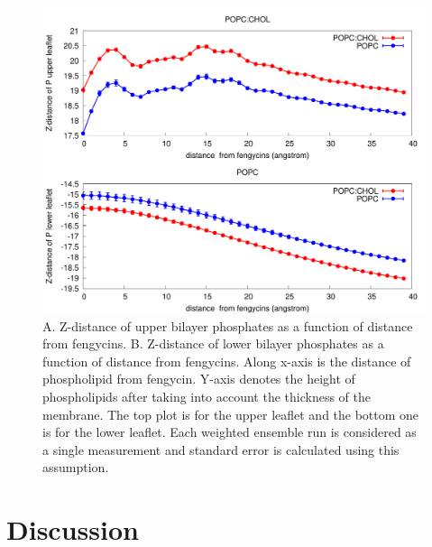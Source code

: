 \begin{figure}[h!]
\centering
\includegraphics[width=5.0in,angle=0,keepaspectratio]{chapter3_figs/z-hist.pdf}
\caption{A. Z-distance of upper bilayer phosphates as a function of distance from fengycins. B. Z-distance of lower bilayer phosphates as a function of distance from fengycins. 
Along x-axis is the distance of phospholipid from fengycin. Y-axis denotes the height of phospholipids after taking into account the thickness of the membrane. The top plot is for the upper leaflet and the bottom one is for the lower leaflet. Each weighted ensemble run is considered as a single measurement and standard error is calculated using this assumption. }
\label{f:z-hist}
\end{figure}

\section{Discussion}

